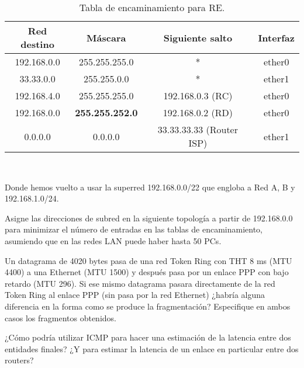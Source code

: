 \begin{ejercicio}
    \begin{table}[H]
        \centering
        \begin{tabular}{|c|c|c|c|}
            \hline
            Red destino & Máscara & Siguiente salto & Interfaz \\
            \hline
            192.168.0.0 & 255.255.255.0 & * & ether0 \\
            \hline
            33.33.0.0 & 255.255.0.0 & * & ether1 \\
            \hline
            192.168.4.0 & 255.255.255.0 & 192.168.0.3 (RC) & ether0 \\
            \hline
            192.168.0.0 & \textbf{255.255.252.0} & 192.168.0.2 (RD) & ether0 \\
            \hline
            0.0.0.0 & 0.0.0.0 & 33.33.33.33 (Router ISP) & ether1 \\
            \hline
        \end{tabular}\\
        \caption{Tabla de encaminamiento para RE.}
    \end{table}
    Donde hemos vuelto a usar la superred 192.168.0.0/22 que engloba a Red A, B y 192.168.1.0/24.
\end{ejercicio}

\begin{ejercicio}
    Asigne las direcciones de subred en la siguiente topología a partir de 192.168.0.0 para minimizar el número de entradas en las tablas de encaminamiento, asumiendo que en las redes LAN puede haber hasta 50 PCs.
\end{ejercicio}

\begin{ejercicio}
    Un datagrama de 4020 bytes pasa de una red Token Ring con THT 8 ms (MTU 4400) a una Ethernet (MTU 1500) y después pasa por un enlace PPP con bajo retardo (MTU 296). Si ese mismo datagrama pasara directamente de la red Token Ring al enlace PPP (sin pasa por la red Ethernet) ¿habría alguna diferencia en la forma como se produce la fragmentación? Especifique en ambos casos los fragmentos obtenidos.
\end{ejercicio}

\begin{ejercicio}
    ¿Cómo podría utilizar ICMP para hacer una estimación de la latencia entre dos entidades finales? ¿Y para estimar la latencia de un enlace en particular entre dos routers?
\end{ejercicio}

